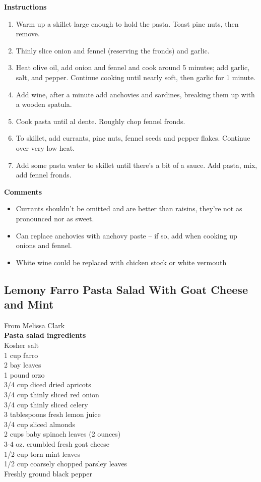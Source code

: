 \documentclass{article}
\numberwithin{figure}{section}
\numberwithin{equation}{section}
\begin{document}
{\bf Instructions}
\begin{enumerate}
\item Warm up a skillet large enough to hold the pasta.  Toast pine nuts, then remove.
\item Thinly slice onion and fennel (reserving the fronds) and garlic.
\item Heat olive oil, add onion and fennel and cook around 5 minutes;  add garlic, salt, and pepper.  Continue cooking until nearly soft, then garlic for 1 minute.
\item Add wine, after a minute add anchovies and sardines, breaking them up with a wooden spatula.
\item Cook pasta until al dente.  Roughly chop fennel fronds.
\item To skillet, add currants, pine nuts, fennel seeds and pepper flakes.  Continue over very low heat.
\item Add some pasta water to skillet until there's a bit of a sauce.  Add pasta, mix, add fennel fronds.
\end{enumerate}

{\bf Comments}
\begin{itemize}
\item Currants shouldn't be omitted and are better than raisins, they're not as pronounced nor as sweet.
\item Can replace anchovies with anchovy paste – if so, add when cooking up onions and fennel.
\item White wine could be replaced with chicken stock or white vermouth
\end{itemize}
 

\pagebreak
\subsection{Lemony Farro Pasta Salad With Goat Cheese and Mint}
From Melissa Clark\\

{\bf Pasta salad ingredients}\\
Kosher salt\\
1 cup farro\\
2 bay leaves\\
1 pound orzo\\
3/4 cup diced dried apricots\\
3/4 cup thinly sliced red onion\\
3/4 cup thinly sliced celery\\
3 tablespoons fresh lemon juice\\
3/4 cup sliced almonds\\
2 cups baby spinach leaves (2 ounces)\\
3-4 oz. crumbled fresh goat cheese\\
1/2 cup torn mint leaves\\
1/2 cup coarsely chopped parsley leaves\\
Freshly ground black pepper\\ 
 
\end{document}
